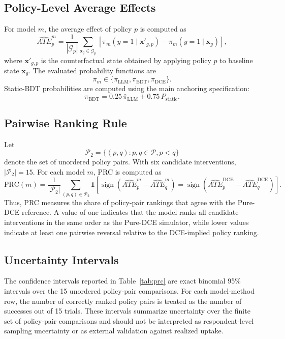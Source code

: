 \documentclass[11pt]{article}
\begin{document}
\subsection{Policy-Level Average Effects}

For model \(m\), the average effect of policy \(p\) is computed as
\[
\widehat{ATE}_{p}^{m}
=
\frac{1}{|\mathcal{G}_p|}
\sum_{\mathbf{x}_g \in \mathcal{G}_p}
\left[
\pi_{m}(y=1\mid \mathbf{x}'_{g,p})
-
\pi_{m}(y=1\mid \mathbf{x}_g)
\right],
\]
where \(\mathbf{x}'_{g,p}\) is the counterfactual state obtained by applying policy \(p\) to baseline state \(\mathbf{x}_g\). The evaluated probability functions are
\[
\pi_m
\in
\{
\pi_{\mathrm{LLM}},
\pi_{\mathrm{BDT}},
\pi_{\mathrm{DCE}}
\}.
\]
Static-BDT probabilities are computed using the main anchoring specification:
\[
\pi_{\mathrm{BDT}}
=
0.25\,\bar{\pi}_{\mathrm{LLM}}
+
0.75\,P_{\mathrm{static}}.
\]

\subsection{Pairwise Ranking Rule}

Let
\[
\mathcal{P}_2
=
\{(p,q): p,q\in\mathcal{P}, p<q\}
\]
denote the set of unordered policy pairs. With six candidate interventions, \(|\mathcal{P}_2|=15\). For each model \(m\), PRC is computed as
\[
\mathrm{PRC}(m)
=
\frac{1}{|\mathcal{P}_2|}
\sum_{(p,q)\in\mathcal{P}_2}
\mathbf{1}
\left[
\operatorname{sign}\!\left(
\widehat{ATE}^{m}_{p}
-
\widehat{ATE}^{m}_{q}
\right)
=
\operatorname{sign}\!\left(
\widehat{ATE}^{\mathrm{DCE}}_{p}
-
\widehat{ATE}^{\mathrm{DCE}}_{q}
\right)
\right].
\]
Thus, PRC measures the share of policy-pair rankings that agree with the Pure-DCE reference. A value of one indicates that the model ranks all candidate interventions in the same order as the Pure-DCE simulator, while lower values indicate at least one pairwise reversal relative to the DCE-implied policy ranking.

\subsection{Uncertainty Intervals}

The confidence intervals reported in Table~\ref{tab:prc} are exact binomial 95\% intervals over the 15 unordered policy-pair comparisons. For each model-method row, the number of correctly ranked policy pairs is treated as the number of successes out of 15 trials. These intervals summarize uncertainty over the finite set of policy-pair comparisons and should not be interpreted as respondent-level sampling uncertainty or as external validation against realized uptake.
\end{document}
